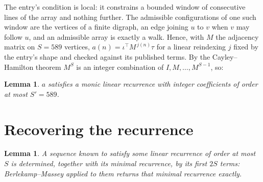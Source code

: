 \documentclass[11pt,a4paper]{article}
\theoremstyle{plain}
\newtheorem{lemma}[theorem]{Lemma}
\theoremstyle{definition}
\begin{document}
The entry's condition is local: it constrains a bounded window of consecutive lines of the
array and nothing further. The admissible configurations of one such window are the vertices
of a finite digraph, an edge joining $u$ to $v$ when $v$ may follow $u$, and an admissible
array is exactly a walk. Hence, with $M$ the adjacency matrix on $S=589$ vertices,
$a(n)=\iota^{\!\top}M^{\,j(n)}\tau$ for a linear reindexing $j$ fixed by the entry's shape
and checked against its published terms. By the Cayley--Hamilton theorem $M^{S}$ is an
integer combination of $I,M,\dots,M^{S-1}$, so:

\begin{lemma}\label{lem:cf}
$a$ satisfies a monic linear recurrence with integer coefficients of order at most
$S'=589$.
\end{lemma}

\section{Recovering the recurrence}

\begin{lemma}\label{lem:bm}
A sequence known to satisfy some linear recurrence of order at most $S$ is determined, together
with its minimal recurrence, by its first $2S$ terms: Berlekamp--Massey applied to them returns
that minimal recurrence exactly.
\end{lemma}
\end{document}
